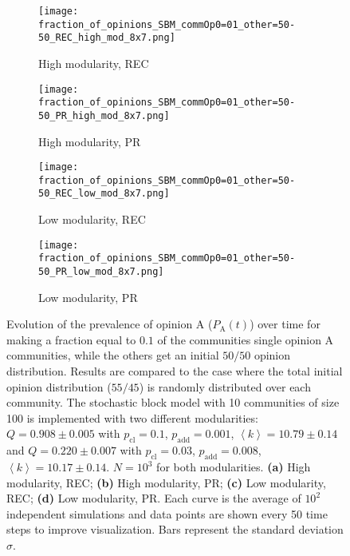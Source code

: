 \documentclass[11 pt , letterpaper , twoside , openright]{book}
\begin{document}
\begin{figure}[H]
  \begin{subfigure}[b]{0.49\textwidth}
    \caption{High modularity, REC}
  	\texttt{[image: fraction\_of\_opinions\_SBM\_commOp0=01\_other=50-50\_REC\_high\_mod\_8x7.png]}
    \label{high_mod_rec}
  \end{subfigure}
  \begin{subfigure}[b]{0.49\textwidth}
    \caption{High modularity, PR}
  	\texttt{[image: fraction\_of\_opinions\_SBM\_commOp0=01\_other=50-50\_PR\_high\_mod\_8x7.png]}
    \label{high_mod_pr}
  \end{subfigure}
  \begin{subfigure}[b]{0.49\textwidth}
   \caption{Low modularity, REC}
    \texttt{[image: fraction\_of\_opinions\_SBM\_commOp0=01\_other=50-50\_REC\_low\_mod\_8x7.png]}
    \label{low_mod_rec}
  \end{subfigure}
  \begin{subfigure}[b]{0.49\textwidth}
    \caption{Low modularity, PR}
    \texttt{[image: fraction\_of\_opinions\_SBM\_commOp0=01\_other=50-50\_PR\_low\_mod\_8x7.png]}
    \label{low_mod_pr}
  \end{subfigure}
  \captionsetup{format=plain}
  \caption[Evolution of the prevalence of opinion A ($P_\text{A}(t)$) over time for making a fraction equal to $0.1$ of the communities single opinion A communities, while the others get an initial $50/50$ opinion distribution. Results are compared to the case where the total initial opinion distribution ($55/45$) is randomly distributed over each community.]{Evolution of the prevalence of opinion A ($P_\text{A}(t)$) over time for making a fraction equal to $0.1$ of the communities single opinion A communities, while the others get an initial $50/50$ opinion distribution. Results are compared to the case where the total initial opinion distribution ($55/45$) is randomly distributed over each community. The stochastic block model with 10 communities of size 100 is implemented with two different modularities: $Q = 0.908 \pm 0.005$ with $p_{\text{cl}} = 0.1$, $p_{\text{add}} = 0.001$, $\left<k\right> = 10.79 \pm 0.14$ and $Q = 0.220 \pm 0.007$ with $p_{\text{cl}} = 0.03$, $p_{\text{add}} = 0.008$, $\left<k\right> = 10.17 \pm 0.14$. $N = 10^3$ for both modularities. \textbf{(a)} High modularity, REC; \textbf{(b)} High modularity, PR; \textbf{(c)} Low modularity, REC; \textbf{(d)} Low modularity, PR. Each curve is the average of $10^2$ independent simulations and data points are shown every 50 time steps to improve visualization. Bars represent the standard deviation $\sigma$.}
\label{commOp0_01_other_50-50}
\end{figure}
\end{document}

